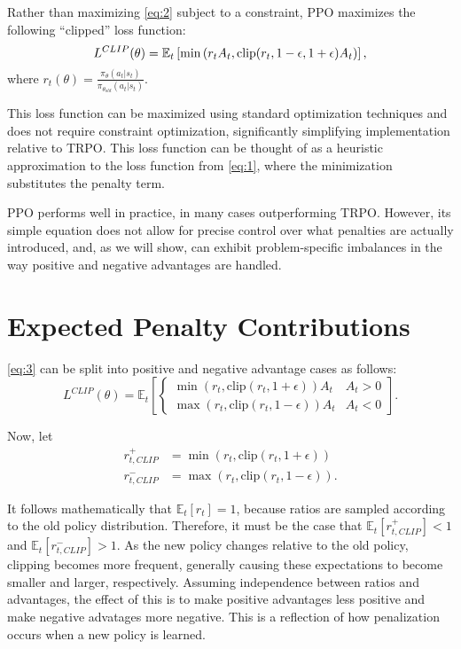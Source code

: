 \documentclass[letterpaper,twocolumn,10pt]{article}
\begin{document}
Rather than maximizing \eqref{eq:2} subject to a constraint, PPO maximizes the
following ``clipped'' loss function:
\small
\begin{equation}
    L^{CLIP}(\theta) = \\
    \mathbb{E}_t\left[ 
    \min\left(r_tA_t, \text{clip}
    (r_t, 1 - \epsilon, 1 + \epsilon)A_t\right)
    \right],
    \label{eq:3}
\end{equation}
\normalsize
where $r_t(\theta) = 
    \frac
    {\pi_{\theta}(a_t | s_t)}
    {\pi_{\theta_{old}} (a_t | s_t)}$.

This loss function can be maximized using standard optimization techniques and
does not require constraint optimization, significantly simplifying
implementation relative to TRPO. This loss function can be thought of as a
heuristic approximation to the loss function from \eqref{eq:1}, where the
minimization substitutes the penalty term.

PPO performs well in practice, in many cases outperforming TRPO. However, its
simple equation does not allow for precise control over what penalties are
actually introduced, and, as we will show, can exhibit problem-specific
imbalances in the way positive and negative advantages are handled. 

\section{Expected Penalty Contributions}

\eqref{eq:3} can be split into positive and negative advantage cases as follows:
\scriptsize
\begin{equation}
    L^{CLIP}(\theta) 
    = \mathbb{E}_t\left[ 
    \begin{cases}
        \min\left(r_t, \text{clip}
        (r_t, 1 + \epsilon)\right)A_t & A_t > 0\\
        \max\left(r_t, \text{clip}
        (r_t, 1 - \epsilon)\right)A_t & A_t < 0
    \end{cases}\right]
    \label{eq:4}.
\end{equation}
\normalsize

Now, let
\begin{align*}
    r_{t, CLIP}^+ &= 
    \min\left(r_t, \text{clip}
    (r_t, 1 + \epsilon)\right)\\
    r_{t, CLIP}^- &= 
    \max\left(r_t, \text{clip}
    (r_t, 1 - \epsilon)\right).
\end{align*}

It follows mathematically that $\mathbb{E}_t\left[ r_t \right] = 1$, because
ratios are sampled according to the old policy distribution. Therefore, it must
be the case that $\mathbb{E}_t\left[ r_{t, CLIP}^+ \right] < 1$ and 
$\mathbb{E}_t\left[ r_{t, CLIP}^- \right] > 1$. As the new policy changes
relative to the old policy, clipping becomes more frequent, generally causing
these expectations to become smaller and larger, respectively. Assuming
independence between ratios and advantages, the effect of this is to make
positive advantages less positive and make negative advatages more negative.
This is a reflection of how penalization occurs when a new policy is learned.
\end{document}
